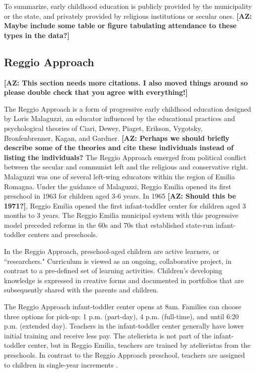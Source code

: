 To summarize, early childhood education is publicly provided by the municipality or the state, and privately provided by religious institutions or secular ones. \textbf{[AZ: Maybe include some table or figure tabulating attendance to these types in the data?]}

\subsection{Reggio Approach}
\textbf{[AZ: This section needs more citations. I also moved things around so please double check that you agree with everything!]}

The Reggio Approach is a form of progressive early childhood education designed by Loris Malaguzzi, an educator influenced by the educational practices and psychological theories of Ciari, Dewey, Piaget, Erikson, Vygotsky, Bronfenbrenner, Kagan, and Gardner. \textbf{[AZ: Perhaps we should briefly describe some of the theories and cite these individuals instead of listing the individuals?} The Reggio Approach emerged from political conflict between the secular and communist left and the religious and conservative right. Malaguzzi was one of several left-wing educators within the region of Emilia Romagna. Under the guidance of Malaguzzi, Reggio Emilia opened its first preschool in 1963 for children aged 3-6 years. In 1965 \textbf{[AZ: Should this be 1971?]}, Reggio Emilia opened the first infant-toddler center for children aged 3 months to 3 years. The Reggio Emilia municipal system with this progressive model preceded reforms in the 60s and 70s that established state-run infant-toddler centers and preschools.

In the Reggio Approach, preschool-aged children are active learners, or ``researchers." Curriculum is viewed as an ongoing, collaborative project, in contrast to a pre-defined set of learning activities. Children's developing knowledge is expressed in creative forms and documented in portfolios that are subsequently shared with the parents and children. 

The Reggio Approach infant-toddler center opens at 8am. Families can choose three options for pick-up: 1 p.m. (part-day), 4 p.m. (full-time), and until 6:20 p.m. (extended day). Teachers in the infant-toddler center generally have lower initial training and receive less pay. The atelierista is not part of the infant-toddler center, but in Reggio Emilia, teachers are trained by atelieristas from the preschools. In contrast to the Reggio Approach preschool, teachers are assigned to children in single-year increments \citep{Cagliari-etal-eds_2016_BOOK_Loris-Malaguzzi,Giudici-Nicolosi_2014_Reggio-Approach}.

